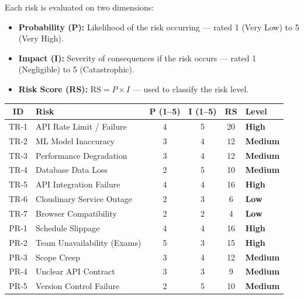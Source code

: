 \documentclass[12pt,a4paper]{article}
\begin{document}
Each risk is evaluated on two dimensions:
\begin{itemize}[noitemsep]
    \item \textbf{Probability (P):} Likelihood of the risk occurring --- rated 1 (Very Low) to 5 (Very High).
    \item \textbf{Impact (I):} Severity of consequences if the risk occurs --- rated 1 (Negligible) to 5 (Catastrophic).
    \item \textbf{Risk Score (RS):} $\text{RS} = P \times I$ --- used to classify the risk level.
\end{itemize}

\bigskip
\begin{center}
\small
\begin{tabular}{c l c c c l}
\toprule
\textbf{ID} & \textbf{Risk} & \textbf{P (1--5)} & \textbf{I (1--5)} & \textbf{RS} & \textbf{Level} \\
\midrule
\rowcolor{highRisk!20}
TR-1 & API Rate Limit / Failure & 4 & 5 & 20 & \textbf{\color{highRisk}High} \\
\rowcolor{medRisk!20}
TR-2 & ML Model Inaccuracy & 3 & 4 & 12 & \textbf{\color{medRisk}Medium} \\
\rowcolor{medRisk!20}
TR-3 & Performance Degradation & 3 & 4 & 12 & \textbf{\color{medRisk}Medium} \\
\rowcolor{medRisk!20}
TR-4 & Database Data Loss & 2 & 5 & 10 & \textbf{\color{medRisk}Medium} \\
\rowcolor{highRisk!20}
TR-5 & API Integration Failure & 4 & 4 & 16 & \textbf{\color{highRisk}High} \\
\rowcolor{lowRisk!20}
TR-6 & Cloudinary Service Outage & 2 & 3 & 6 & \textbf{\color{lowRisk}Low} \\
\rowcolor{lowRisk!20}
TR-7 & Browser Compatibility & 2 & 2 & 4 & \textbf{\color{lowRisk}Low} \\
\rowcolor{highRisk!20}
PR-1 & Schedule Slippage & 4 & 4 & 16 & \textbf{\color{highRisk}High} \\
\rowcolor{highRisk!20}
PR-2 & Team Unavailability (Exams) & 5 & 3 & 15 & \textbf{\color{highRisk}High} \\
\rowcolor{medRisk!20}
PR-3 & Scope Creep & 3 & 4 & 12 & \textbf{\color{medRisk}Medium} \\
\rowcolor{medRisk!20}
PR-4 & Unclear API Contract & 3 & 3 & 9 & \textbf{\color{medRisk}Medium} \\
\rowcolor{lowRisk!20}
PR-5 & Version Control Failure & 2 & 5 & 10 & \textbf{\color{medRisk}Medium} \\

\end{tabular}
\end{center}
\end{document}
